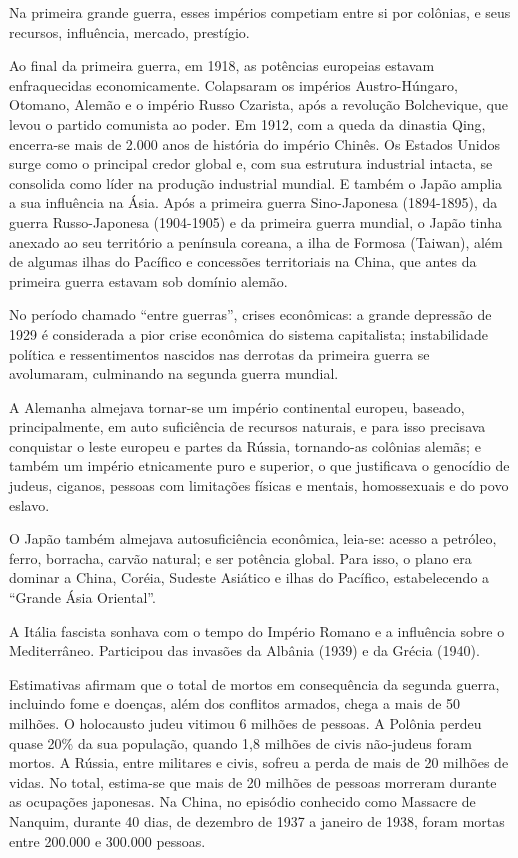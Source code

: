 \documentclass{hipatia}
\begin{document}
	Na primeira grande guerra, esses impérios competiam entre si por colônias, e seus recursos, influência, mercado, prestígio. 

Ao final da primeira guerra, em 1918, as potências europeias estavam enfraquecidas economicamente. Colapsaram os impérios Austro-Húngaro, Otomano, Alemão e o império Russo Czarista, após a revolução Bolchevique, que levou o partido comunista ao poder. Em 1912, com a queda da dinastia Qing, encerra-se mais de 2.000 anos de história do império Chinês.  Os Estados Unidos surge como o principal credor global e, com sua estrutura industrial intacta, se consolida como líder na produção industrial mundial. E também o Japão amplia a sua influência na Ásia. Após a primeira guerra Sino-Japonesa (1894-1895), da guerra Russo-Japonesa (1904-1905) e da primeira guerra mundial, o Japão tinha anexado ao seu território a península coreana, a ilha de Formosa (Taiwan),  além de algumas ilhas do Pacífico e concessões territoriais na China, que antes da primeira guerra estavam sob domínio alemão.

No período chamado ``entre guerras'', crises econômicas: a grande depressão de 1929 é considerada a pior crise econômica do sistema capitalista; instabilidade política e ressentimentos nascidos nas derrotas da primeira guerra se avolumaram, culminando na segunda guerra mundial.

A Alemanha almejava tornar-se um império continental europeu, baseado, principalmente, em auto suficiência de recursos naturais, e para isso precisava conquistar o leste europeu e partes da Rússia, tornando-as colônias alemãs; e também um império etnicamente puro e superior, o que justificava o genocídio de judeus, ciganos, pessoas com limitações físicas e mentais, homossexuais e do povo eslavo. 

O Japão também almejava autosuficiência econômica, leia-se: acesso a petróleo, ferro, borracha, carvão natural; e ser potência global. Para isso, o plano era dominar a China, Coréia, Sudeste Asiático e ilhas do Pacífico, estabelecendo a ``Grande Ásia Oriental''. 

A Itália fascista sonhava com o tempo do Império Romano e a influência sobre o Mediterrâneo. Participou das invasões da Albânia (1939) e da Grécia (1940).

Estimativas afirmam que o total de mortos em consequência da segunda guerra, incluindo fome e doenças, além dos conflitos armados, chega a mais de 50 milhões. O holocausto judeu vitimou 6 milhões de pessoas. A Polônia perdeu quase 20\% da sua população, quando 1,8 milhões de civis não-judeus foram mortos. A Rússia, entre militares e civis, sofreu a perda de mais de 20 milhões de vidas. No total, estima-se que mais de 20 milhões de pessoas morreram durante as ocupações japonesas. Na China, no episódio conhecido como Massacre de Nanquim, durante 40 dias, de dezembro de 1937 a janeiro de 1938, foram mortas entre 200.000 e 300.000 pessoas.
\end{document}
